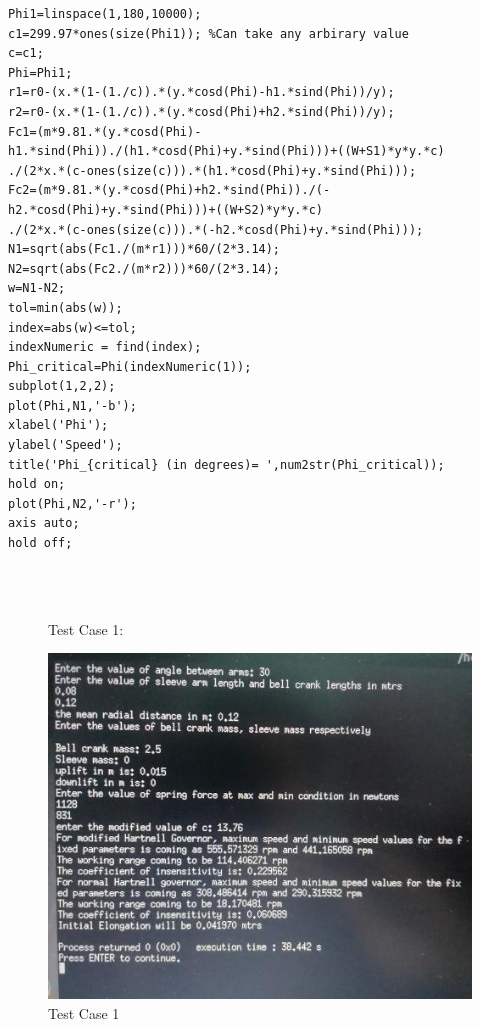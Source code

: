 \documentclass[15pt,a4paper,oneside]{article}
\begin{document}
\begin{verbatim}
Phi1=linspace(1,180,10000);
c1=299.97*ones(size(Phi1)); %Can take any arbirary value
c=c1;
Phi=Phi1;
r1=r0-(x.*(1-(1./c)).*(y.*cosd(Phi)-h1.*sind(Phi))/y);
r2=r0-(x.*(1-(1./c)).*(y.*cosd(Phi)+h2.*sind(Phi))/y);
Fc1=(m*9.81.*(y.*cosd(Phi)-h1.*sind(Phi))./(h1.*cosd(Phi)+y.*sind(Phi)))+((W+S1)*y*y.*c)
./(2*x.*(c-ones(size(c))).*(h1.*cosd(Phi)+y.*sind(Phi)));
Fc2=(m*9.81.*(y.*cosd(Phi)+h2.*sind(Phi))./(-h2.*cosd(Phi)+y.*sind(Phi)))+((W+S2)*y*y.*c)
./(2*x.*(c-ones(size(c))).*(-h2.*cosd(Phi)+y.*sind(Phi)));
N1=sqrt(abs(Fc1./(m*r1)))*60/(2*3.14);
N2=sqrt(abs(Fc2./(m*r2)))*60/(2*3.14);
w=N1-N2;
tol=min(abs(w));
index=abs(w)<=tol;
indexNumeric = find(index);
Phi_critical=Phi(indexNumeric(1));
subplot(1,2,2);
plot(Phi,N1,'-b');
xlabel('Phi');
ylabel('Speed');
title('Phi_{critical} (in degrees)= ',num2str(Phi_critical));
hold on;
plot(Phi,N2,'-r');
axis auto;
hold off;
\end{verbatim}\\
\\
\begin{figure}[p]
	Test Case 1:\\
	\centerline{\includegraphics[scale=0.6]{2.png}}
	\caption{Test Case 1}
	\label{fig}
\end{figure}\\
\\[2cm]
\end{document}
